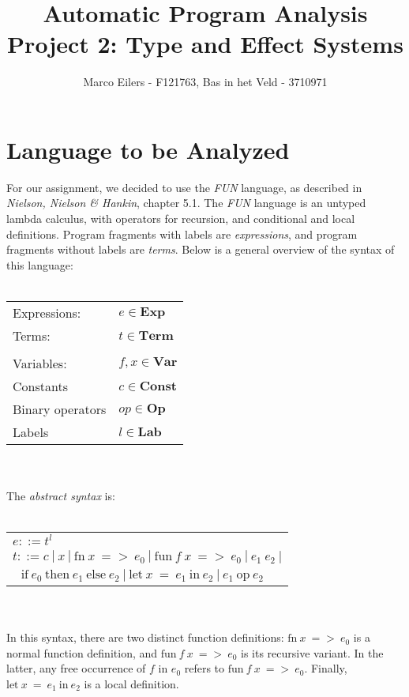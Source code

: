 \documentclass[a4paper,11pt]{article}
\begin{document}
\title{Automatic Program Analysis\\Project 2: Type and Effect Systems}
\author{Marco Eilers - F121763, Bas in het Veld - 3710971}

\maketitle

\section{Language to be Analyzed}

For our assignment, we decided to use the \emph{FUN} language, as described in \emph{Nielson, Nielson \& Hankin}, chapter 5.1.
The \emph{FUN} language is an untyped lambda calculus, with operators for recursion, and conditional and local definitions.
Program fragments with labels are \emph{expressions}, and program fragments without labels are \emph{terms}.
Below is a general overview of the syntax of this language:
\\
\\
\begin{tabular}{l l}
Expressions: &	$e \in \textbf{Exp}$ \\
Terms: &		$t \in \textbf{Term}$ \\
 & \\
Variables: &		$f,x \in \textbf{Var}$ \\
Constants &		$c \in \textbf{Const} $ \\
Binary operators &	$op \in \textbf{Op} $ \\
Labels &		$l \in \textbf{Lab} $ \\
\end{tabular}
\\
\\
The \emph{abstract syntax} is:
\\
\\
\begin{tabular}{l}
$e ::= t^l$ \\
$t ::= c\:|\:x\:|\:\text{fn}\:x\:=>\:e_0\:|\:\text{fun}\:f\:x\:=>\:e_0\:|\:e_1\:e_2\:|$ \\
$\:\:\:\text{if}\:e_0\:\text{then}\:e_1\:\text{else}\:e_2\:|\:\text{let}\:x\:=\:e_1\:\text{in}\:e_2\:|\:e_1\:\text{op}\:e_2$ \\
\end{tabular}
\\
\\
In this syntax, there are two distinct function definitions: $\text{fn}\:x\:=>\:e_0$ is a normal function definition, and $\text{fun}\:f\:x\:=>\:e_0$ is its recursive variant.
In the latter, any free occurrence of $f$ in $e_0$ refers to $\text{fun}\:f\:x\:=>\:e_0$.
Finally, $\text{let}\:x\:=\:e_1\:\text{in}\:e_2$ is a local definition.
\end{document}
